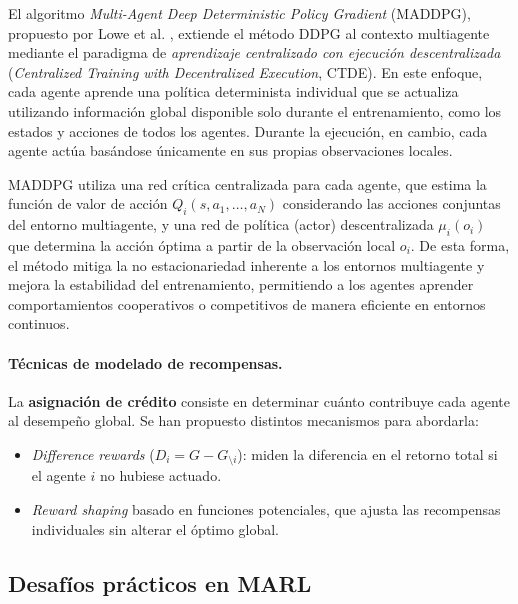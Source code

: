 El algoritmo \textit{Multi-Agent Deep Deterministic Policy Gradient} (MADDPG), propuesto por Lowe et al. \cite{lowe2017maddpg}, extiende el método DDPG al contexto multiagente mediante el paradigma de \textit{aprendizaje centralizado con ejecución descentralizada} (\textit{Centralized Training with Decentralized Execution}, CTDE). En este enfoque, cada agente aprende una política determinista individual que se actualiza utilizando información global disponible solo durante el entrenamiento, como los estados y acciones de todos los agentes. Durante la ejecución, en cambio, cada agente actúa basándose únicamente en sus propias observaciones locales.

MADDPG utiliza una red crítica centralizada para cada agente, que estima la función de valor de acción \(Q_i(s, a_1, \dots, a_N)\) considerando las acciones conjuntas del entorno multiagente, y una red de política (actor) descentralizada \(\mu_i(o_i)\) que determina la acción óptima a partir de la observación local \(o_i\). De esta forma, el método mitiga la no estacionariedad inherente a los entornos multiagente y mejora la estabilidad del entrenamiento, permitiendo a los agentes aprender comportamientos cooperativos o competitivos de manera eficiente en entornos continuos.


\paragraph{Técnicas de modelado de recompensas.}
La \textbf{asignación de crédito} consiste en determinar cuánto contribuye cada agente al desempeño global.  
Se han propuesto distintos mecanismos para abordarla:
\begin{itemize}
  \item \emph{Difference rewards} (\(D_i = G - G_{\setminus i}\)): miden la diferencia en el retorno total si el agente $i$ no hubiese actuado.
  \item \emph{Reward shaping} basado en funciones potenciales, que ajusta las recompensas individuales sin alterar el óptimo global. \cite{difference_rewards}
\end{itemize}

\subsection{Desafíos prácticos en MARL}


